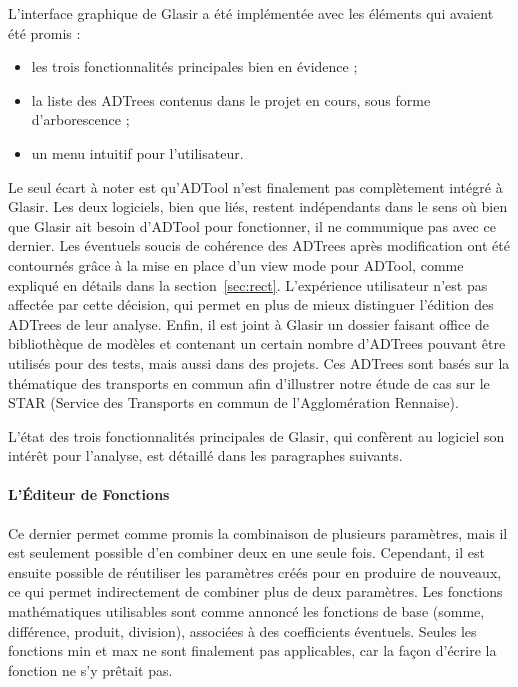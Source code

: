 L'interface graphique de Glasir a été implémentée avec les éléments qui avaient été promis : 
\begin{itemize}
    \item les trois fonctionnalités principales bien en évidence ;
    \item la liste des ADTrees contenus dans le projet en cours, sous forme d'arborescence ;
    \item un menu intuitif pour l'utilisateur.
\end{itemize}
Le seul écart à noter est qu'ADTool n'est finalement pas complètement intégré à Glasir. Les deux logiciels, bien que liés, restent indépendants dans le sens où bien que Glasir ait besoin d'ADTool pour fonctionner, il ne communique pas avec ce dernier. Les éventuels soucis de cohérence des ADTrees après modification ont été contournés grâce à la mise en place d'un \og view mode \fg{} pour ADTool, comme expliqué en détails dans la {\sc section}~\ref{sec:rect}. L'expérience utilisateur n'est pas affectée par cette décision, qui permet en plus de mieux distinguer l'édition des ADTrees de leur analyse. Enfin, il est joint à Glasir un dossier faisant office de bibliothèque de modèles et contenant un certain nombre d'ADTrees pouvant être utilisés pour des tests, mais aussi dans des projets. Ces ADTrees sont basés sur la thématique des transports en commun afin d'illustrer notre étude de cas sur le STAR (Service des Transports en commun de l'Agglomération Rennaise).

L'état des trois fonctionnalités principales de Glasir, qui confèrent au logiciel son intérêt pour l'analyse, est détaillé dans les paragraphes suivants.

\paragraph{L'Éditeur de Fonctions} Ce dernier permet comme promis la combinaison de plusieurs paramètres, mais il est seulement possible d'en combiner deux en une seule fois. Cependant, il est ensuite possible de réutiliser les paramètres créés pour en produire de nouveaux, ce qui permet indirectement de combiner plus de deux paramètres. Les fonctions mathématiques utilisables sont comme annoncé les fonctions de base (somme, différence, produit, division), associées à des coefficients éventuels. Seules les fonctions min et max ne sont finalement pas applicables, car la façon d'écrire la fonction ne s'y prêtait pas.

